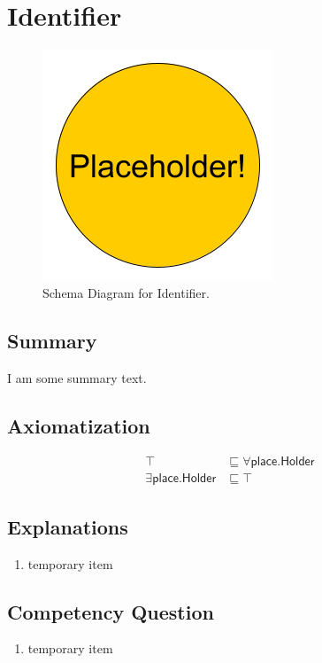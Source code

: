 \section{Identifier}
\label{sec:Identifier}
\begin{figure}[h!]
\begin{center}
\includegraphics[width=.4\textwidth]{figures/placeholder}
\end{center}
\caption{Schema Diagram for Identifier.}
\label{fig:Identifier}
\end{figure}
\subsection{Summary}
\label{sum:Identifier}
I am some summary text.

\subsection{Axiomatization}
\label{axs:Identifier}
\begin{align}
\top &\sqsubseteq \forall\textsf{place.Holder} \\ 
\exists\textsf{place.Holder} &\sqsubseteq \top 
\end{align}

\subsection{Explanations}
\label{exp:Identifier}
\begin{enumerate}
\item temporary item
\end{enumerate}

\subsection{Competency Question}
\label{cqs:Identifier}
\begin{enumerate}[CQ1.]
\item temporary item
\end{enumerate}

\newpage
